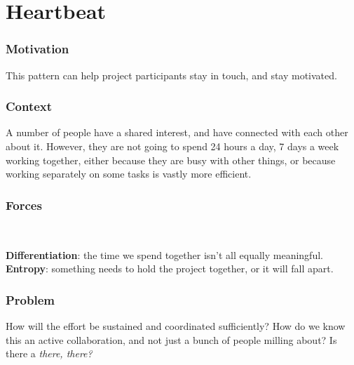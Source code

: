\section{Heartbeat}\label{sec:Heartbeat}

\subsubsection*{Motivation} This pattern can help project participants stay in touch, and stay motivated.

\subsubsection*{Context}
A number of people have a shared interest, and have connected with each other about it.  However, they are not going to spend 24 hours a day, 7 days a week working together, either because they are busy with other things, or because working separately on some tasks is vastly more efficient.

\subsubsection*{Forces}~
\parbox[t]{.85\textwidth}{
\textbf{Differentiation}: the time we spend together isn't all equally meaningful.\\
\textbf{Entropy}: something needs to hold the project together, or it will fall apart.
}

\subsubsection*{Problem} How will the effort be sustained and coordinated sufficiently?  How do we know this an active collaboration, and not just a bunch of people milling about?  Is there a \emph{there, there?}  

